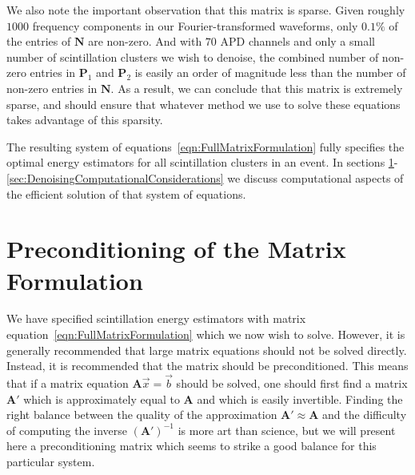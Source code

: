 We also note the important observation that this matrix is sparse.  Given roughly $1000$ frequency components in our Fourier-transformed waveforms, only $0.1\%$ of the entries of $\mathbf{N}$ are non-zero.  And with $70$ APD channels and only a small number of scintillation clusters we wish to denoise, the combined number of non-zero entries in $\mathbf{P}_1$ and $\mathbf{P}_2$ is easily an order of magnitude less than the number of non-zero entries in $\mathbf{N}$.  As a result, we can conclude that this matrix is extremely sparse, and should ensure that whatever method we use to solve these equations takes advantage of this sparsity.

The resulting system of equations~\ref{eqn:FullMatrixFormulation} fully specifies the optimal energy estimators for all scintillation clusters in an event.  In sections \ref{sec:Preconditioning}-\ref{sec:DenoisingComputationalConsiderations} we discuss computational aspects of the efficient solution of that system of equations.

\section{Preconditioning of the Matrix Formulation}\label{sec:Preconditioning}

We have specified scintillation energy estimators with matrix equation~\ref{eqn:FullMatrixFormulation} which we now wish to solve.  However, it is generally recommended that large matrix equations should not be solved directly.  Instead, it is recommended that the matrix should be preconditioned.  This means that if a matrix equation $\mathbf{A}\vec{x} = \vec{b}$ should be solved, one should first find a matrix $\mathbf{A}'$ which is approximately equal to $\mathbf{A}$ and which is easily invertible.  Finding the right balance between the quality of the approximation $\mathbf{A}' \approx \mathbf{A}$ and the difficulty of computing the inverse $\left(\mathbf{A}'\right)^{-1}$ is more art than science, but we will present here a preconditioning matrix which seems to strike a good balance for this particular system.

